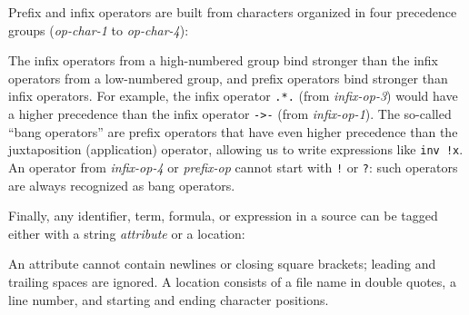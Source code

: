 Prefix and infix operators are built from characters organized in four
precedence groups (\textsl{op-char-1} to \textsl{op-char-4}):
\begin{center}\end{center}
The infix operators from a high-numbered group bind stronger
than the infix operators from a low-numbered group,
and prefix operators bind stronger than infix operators.
For example, the infix operator \texttt{.*.} (from \textsl{infix-op-3})
would have a higher precedence than the infix operator \texttt{->-}
(from \textsl{infix-op-1}).
The so-called ``bang operators'' are prefix operators that have even
higher precedence than the juxtaposition (application) operator,
allowing us to write expressions like \texttt{inv !x}.
An operator from \textsl{infix-op-4} or \textsl{prefix-op}
cannot start with \texttt{!} or \texttt{?}: such operators
are always recognized as bang operators.


Finally, any identifier, term, formula, or expression
in a \whyml source can be tagged either with a string
\textit{attribute} or a location:
\begin{center}\end{center}
An attribute cannot contain newlines or closing square brackets;
leading and trailing spaces are ignored.
A location consists of a file name in double quotes,
a line number, and starting and ending character positions.

